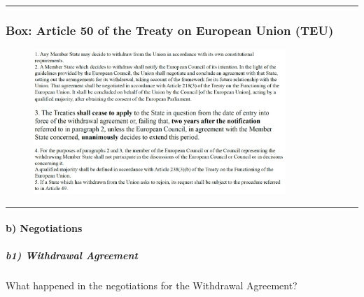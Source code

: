 \hrule

\subsubsection{Box: Article 50 of the Treaty on European Union (TEU)}

\begin{figure}[h]
    \centering
    \includegraphics[width=0.85\textwidth]{Pictures/Art_50.png}
\end{figure}

\hrule

\paragraph{b) Negotiations}

\subparagraph{b1) Withdrawal Agreement}

What happened in the negotiations for the Withdrawal Agreement?

